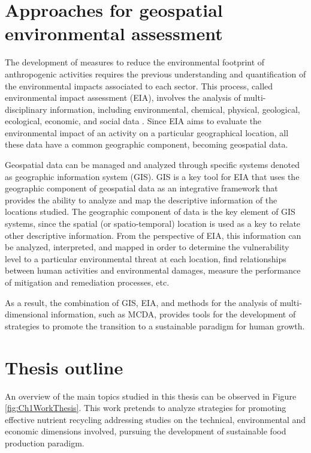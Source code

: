 \begin{refsection}[referencesCh1]
\section{Approaches for geospatial environmental assessment}
The development of measures to reduce the environmental footprint of anthropogenic activities requires the previous understanding and quantification of the environmental impacts associated to each sector. This process, called environmental impact assessment (EIA), involves the analysis of multi-disciplinary information, including environmental, chemical, physical, geological, ecological, economic, and social data \citep{gharehbaghi2018gis}. Since EIA aims to evaluate the environmental impact of an activity on a particular geographical location, all these data have a common geographic component, becoming geospatial data.

Geospatial data can be managed and analyzed through specific systems denoted as geographic information system (GIS). GIS is a key tool for EIA that uses the geographic component of geospatial data as an integrative framework that provides the ability to analyze and map the descriptive information of the locations studied. The geographic component of data is the key element of GIS systems, since the spatial (or spatio-temporal) location is used as a key to relate other descriptive information. From the perspective of EIA, this information can be analyzed, interpreted, and mapped in order to determine the vulnerability level to a particular environmental threat at each location, find relationships between human activities and environmental damages, measure the performance of mitigation and remediation processes, etc.

As a result, the combination of GIS, EIA, and methods for the analysis of multi-dimensional information, such as MCDA, provides tools for the development of strategies to promote the transition to a sustainable paradigm for human growth. 

\section{Thesis outline}
An overview of the main topics studied in this thesis can be observed in Figure \ref{fig:Ch1WorkThesis}. This work pretends to analyze strategies for promoting effective nutrient recycling addressing studies on the technical, environmental and economic dimensions involved, pursuing the development of sustainable food production paradigm.


\end{refsection}
